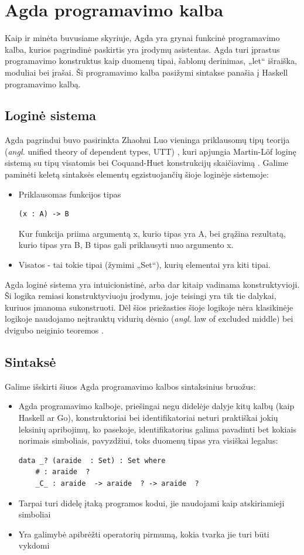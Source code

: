 \documentclass{VUMIFPSkursinis}
\begin{document}
\section{Agda programavimo kalba}
Kaip ir minėta buvusiame skyriuje, Agda yra grynai funkcinė programavimo kalba, kurios pagrindinė paskirtis yra įrodymų asistentas. Agda turi įprastus programavimo konstruktus kaip duomenų tipai, šablonų derinimas, „let“ išraiška, moduliai bei įrašai. Ši programavimo kalba pasižymi sintakse panašia į Haskell programavimo kalbą.
\subsection{Loginė sistema}
Agda pagrindui buvo pasirinkta Zhaohui Luo vieninga priklausomų tipų teorija (\textit{angl.} unified theory of dependent types, UTT) \cite{agdaInitial}, kuri apjungia Martin-Löf loginę sistemą su tipų visatomis bei Coquand-Huet konstrukcijų skaičiavimą \cite{schematicApproach}. Galime paminėti keletą sintaksės elementų egzistuojančių šioje loginėje sistemoje:
\begin{itemize}
	\item{ Priklausomas funkcijos tipas
		\begin{lstlisting}
(x : A) -> B
		\end{lstlisting}
		Kur funkcija priima argumentą x, kurio tipas yra A, bei grąžina rezultatą, kurio tipas yra B, B tipas gali priklausyti nuo argumento x.
	}
	\item Visatos - tai tokie tipai (žymimi „Set“), kurių elementai yra kiti tipai.
\end{itemize}
Agda loginė sistema yra intuicionistinė, arba dar kitaip vadinama konstruktyvioji. Ši logika remiasi konstruktyviuoju įrodymu, joje teisingi yra tik tie dalykai, kuriuos įmanoma sukonstruoti. Dėl šios priežasties šioje logikoje nėra klasikinėje logikoje naudojamo neįtrauktų vidurių dėsnio (\textit{angl.} law of excluded middle) bei dvigubo neiginio teoremos \cite{intuitionistic}.
\subsection{Sintaksė}
Galime išskirti šiuos Agda programavimo kalbos sintaksinius bruožus:
\begin{itemize}
	\item {Agda programavimo kalboje, priešingai negu didelėje dalyje kitų kalbų (kaip Haskell ar Go), konstruktoriai bei identifikatoriai neturi praktiškai jokių leksinių apribojimų, ko pasekoje, identifikatorius galima pavadinti bet kokiais norimais simboliais, pavyzdžiui, toks duomenų tipas yra visiškai legalus:
	\begin{lstlisting}
data _? (araide  : Set) : Set where
	# : araide  ?
	_C_ : araide  -> araide  ? -> araide  ?
	\end{lstlisting}
	}
	\item Tarpai turi didelę įtaką programos kodui, jie naudojami kaip atskiriamieji simboliai
	\item Yra galimybė apibrėžti operatorių pirmumą, kokia tvarka jie turi būti vykdomi 
\end{itemize}
\end{document}
